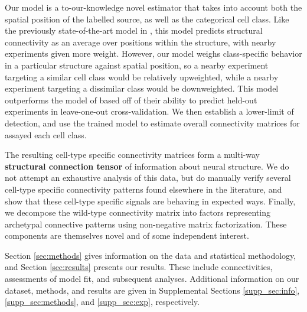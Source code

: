 Our model is a to-our-knowledge novel estimator that takes into account both the spatial position of the labelled source, as well as the categorical cell class.
Like the previously state-of-the-art model in \citet{Knox2019-ot}, this model predicts structural connectivity as an average over positions within the structure, with nearby experiments given more weight.
However, our model weighs class-specific behavior in a particular structure against spatial position, so a nearby experiment targeting a similar cell class would be relatively upweighted, while a nearby experiment targeting a dissimilar class would be downweighted.
This model outperforms the model of  \citet{Knox2019-ot} based off of their ability to predict held-out experiments in leave-one-out cross-validation.
We then establish a lower-limit of detection, and use the trained model to estimate overall connectivity matrices for assayed each cell class.

The resulting cell-type specific connectivity matrices form a multi-way \textbf{structural connection tensor} of information about neural structure.
We do not attempt an exhaustive analysis of this data, but do manually verify several cell-type specific connectivity patterns found elsewhere in the literature, and show that these cell-type specific signals are behaving in expected ways.
Finally, we decompose the wild-type connectivity matrix into factors representing archetypal connective patterns using non-negative matrix factorization.
These components are themselves novel and of some independent interest.

Section \ref{sec:methods} gives information on the data and statistical methodology, and Section \ref{sec:results} presents our results.
These include connectivities, assessments of model fit, and subsequent analyses.
Additional information on our dataset, methods, and results are given in Supplemental Sections \ref{supp_sec:info}, \ref{supp_sec:methods}, and \ref{supp_sec:exp}, respectively.
